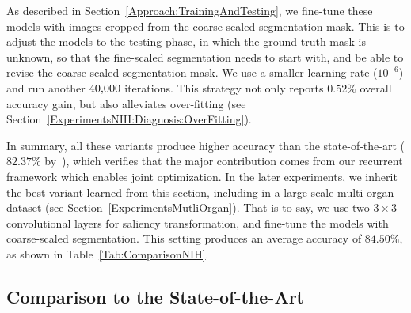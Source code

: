 \documentclass[10pt,twocolumn,letterpaper]{article}
\begin{document}
As described in Section~\ref{Approach:TrainingAndTesting},
we fine-tune these models with images cropped from the coarse-scaled segmentation mask.
This is to adjust the models to the testing phase, in which the ground-truth mask is unknown,
so that the fine-scaled segmentation needs to start with, and be able to revise the coarse-scaled segmentation mask.
We use a smaller learning rate ($10^{-6}$) and run another $40\rm{,}000$ iterations.
This strategy not only reports $0.52\%$ overall accuracy gain,
but also alleviates over-fitting (see Section~\ref{ExperimentsNIH:Diagnosis:OverFitting}).

In summary, all these variants produce higher accuracy than the state-of-the-art ($82.37\%$ by~\cite{Zhou_2017_Fixed}),
which verifies that the major contribution comes from our recurrent framework which enables joint optimization.
In the later experiments, we inherit the best variant learned from this section,
including in a large-scale multi-organ dataset (see Section~\ref{ExperimentsMutliOrgan}).
That is to say, we use two $3\times3$ convolutional layers for saliency transformation,
and fine-tune the models with coarse-scaled segmentation.
This setting produces an average accuracy of $84.50\%$, as shown in Table~\ref{Tab:ComparisonNIH}.


\subsection{Comparison to the State-of-the-Art}
\label{ExperimentsNIH:Comparison}
\end{document}

